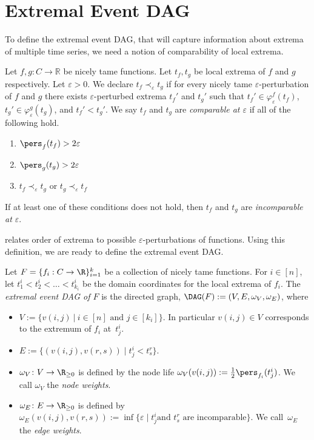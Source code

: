 \section{Extremal Event DAG}

To define the extremal event DAG, that will capture information about extrema of multiple time series, we need a notion of comparability of local extrema.

\begin{defn}
Let $f,g: C\rightarrow \mathbb{R}$ be nicely tame functions.
Let $t_f, t_g$ be local extrema of $f$ and $g$ respectively. Let $\varepsilon > 0$. We declare $t_f \prec_\varepsilon t_g$ if for
every nicely tame $\varepsilon$-perturbation of $f$ and $g$ there exists $\varepsilon$-perturbed extrema
$t_f'$ and $t_g'$ such that $t_f' \in \varphi^f_{\varepsilon}(t_f)$, $t_g' \in \varphi^g_{\varepsilon}(t_g)$, and  $t_f'<t_g'$. We say $t_f$ and $t_g$ are
\emph{comparable at $\varepsilon$} if all of the following hold.
\begin{enumerate}
\item $\pers_f(t_f) > 2\varepsilon$
\item $\pers_g(t_g) > 2\varepsilon$
\item $t_f\prec_\varepsilon t_g$ or $t_g \prec_\varepsilon t_f$
\end{enumerate}
If at least one of these conditions does not hold, then $t_f$ and $t_g$ are \emph{incomparable at $\varepsilon$}. \label{def:comparable}
\end{defn}

 relates order of extrema to possible $\varepsilon$-perturbations of functions. Using this definition, we are ready to define the extremal event DAG.

\begin{defn}\label{def:extremal-DAG}
    Let $F=\{f_i:C \rightarrow \R\}_{i=1}^k$ be a collection of nicely tame
    functions. For $i \in [n]$, let $t_1^i<t_2^i<\dots <t_{k_i}^i$ be the domain coordinates for
    the local extrema of $f_i$.
    The \emph{extremal event DAG of $F$} is the directed graph,
    $\DAG(F):=(V, E,\omega_V,\omega_E)$, where
    \begin{itemize}
        \item $V:= \{ v(i,j) ~|~ i \in [n] \text{ and } j\in [k_i] \}$. In
            particular $v(i,j)\in V$ corresponds to the extremum of $f_i$ at~$t_j^i$.
        \item $E := \{ (v(i,j), v(r,s)) \mid t_j^i < t_s^r \}$.
        \item $\omega_V \colon V \to \R_{\geq 0}$
            is defined by the node life $\omega_V(v(i,j)):=\frac{1}{2}\pers_{f_i}(t_j^i)$.
            We call $\omega_V$ the \emph{node weights}.
        \item $\omega_E \colon E \to \R_{\geq 0}$ is defined by $\omega_{E}(v(i,j), v(r,s))
            := \inf\{\varepsilon\mid t_j^i \text{
                and } t_s^r \text{ are incomparable}\}$. We call~$\omega_E$ the \emph{edge weights}.
    \end{itemize}
\end{defn}

